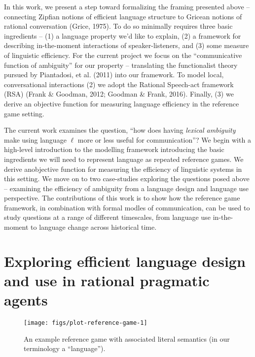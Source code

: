 \documentclass[10pt, letterpaper]{article}
\newenvironment{CodeChunk}{}{}
\begin{document}
In this work, we present a step toward formalizing the framing presented
above -- connecting Zipfian notions of efficient language structure to
Gricean notions of rational conversation (Grice, 1975). To do so
minimally requires three basic ingredients -- (1) a language property
we'd like to explain, (2) a framework for describing in-the-moment
interactions of speaker-listeners, and (3) some measure of linguistic
efficiency. For the current project we focus on the ``communicative
function of ambiguity'' for our property -- translating the
functionalist theory pursued by Piantadosi, et al. (2011) into our
framework. To model local, conversational interactions (2) we adopt the
Rational Speech-act framework (RSA) (Frank \& Goodman, 2012; Goodman \&
Frank, 2016). Finally, (3) we derive an objective function for measuring
language efficiency in the reference game setting.\par

The current work examines the question, ``how does having
\textit{lexical ambiguity} make using language \(\ell\) more or less
useful for communication''? We begin with a high-level introduction to
the modelling framework introducing the basic ingredients we will need
to represent language as repeated reference games. We derive anobjective
function for measuring the efficiency of linguistic systems in this
setting. We move on to two case-studies exploring the questions posed
above -- examining the efficiency of ambiguity from a language design
and language use perspective. The contributions of this work is to show
how the reference game framework, in combination with formal modles of
communication, can be used to study questions at a range of different
timescales, from language use in-the-moment to language change across
historical time.\par

\section{Exploring efficient language design and use in rational
pragmatic
agents}\label{exploring-efficient-language-design-and-use-in-rational-pragmatic-agents}

\begin{CodeChunk}
\begin{figure}[H]

{\centering \texttt{[image: figs/plot-reference-game-1]} 

}

\caption[An example reference game with associated literal semantics (in our terminology a ``language'')]{An example reference game with associated literal semantics (in our terminology a ``language'').}\label{fig:plot-reference-game}
\end{figure}
\end{CodeChunk}
\end{document}
